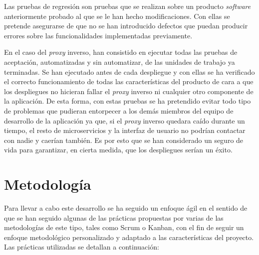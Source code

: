 \documentclass[11pt,spanish,listoffigures]{tfgetsinf}
\begin{document}
Las pruebas de regresión son pruebas que se realizan sobre un producto \emph{software} anteriormente probado al que se le han hecho modificaciones. Con ellas se pretende asegurarse de que no se han introducido defectos que puedan producir errores sobre las funcionalidades implementadas previamente. 

En el caso del \emph{proxy} inverso, han consistido en ejecutar todas las pruebas de aceptación, automatizadas y sin automatizar, de las unidades de trabajo ya terminadas. Se han ejecutado antes de cada despliegue y con ellas se ha verificado el correcto funcionamiento de todas las características del producto de cara a que los despliegues no hicieran fallar el \emph{proxy} inverso ni cualquier otro componente de la aplicación. De esta forma, con estas pruebas se ha pretendido evitar todo tipo de problemas que pudieran entorpecer a los demás miembros del equipo de desarrollo de la aplicación ya que, si el \emph{proxy} inverso quedara caído durante un tiempo, el resto de microservicios y la interfaz de usuario no podrían contactar con nadie y caerían también. Es por esto que se han considerado un seguro de vida para garantizar, en cierta medida, que los despliegues serían un éxito.

\newpage %


	\section{Metodología} \label{metodologia}

Para llevar a cabo este desarrollo se ha seguido un enfoque ágil en el sentido de que se han seguido algunas de las prácticas propuestas por varias de las metodologías de este tipo, tales como Scrum o Kanban, con el fin de seguir un enfoque metodológico personalizado y adaptado a las características del proyecto. Las prácticas utilizadas se detallan a continuación:
\end{document}
